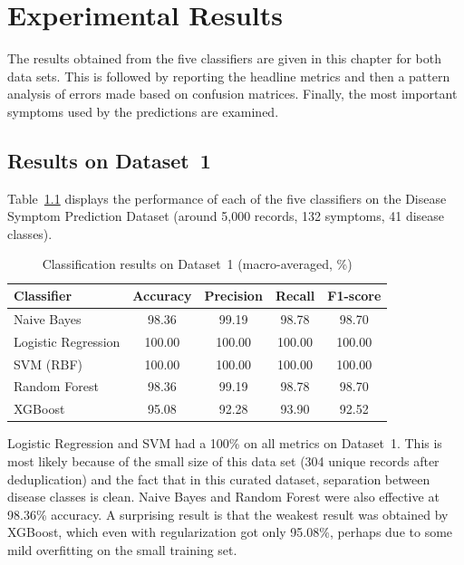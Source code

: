 \chapter{Experimental Results}
\label{ch:results}

The results obtained from the five classifiers are given in this chapter for both data sets. This is followed by reporting the headline metrics and then a pattern analysis of errors made based on confusion matrices. Finally, the most important symptoms used by the predictions are examined.

\section{Results on Dataset~1}
\label{sec:results_dataset1}

Table~\ref{tab:results_dataset1} displays the performance of each of the five classifiers on the Disease Symptom Prediction Dataset (around 5,000 records, 132 symptoms, 41 disease classes).

\begin{table}[H]
\centering
\caption{Classification results on Dataset~1 (macro-averaged, \%)}
\label{tab:results_dataset1}
\begin{tabular}{@{}lcccc@{}}
\toprule
\textbf{Classifier} & \textbf{Accuracy} & \textbf{Precision} & \textbf{Recall} & \textbf{F1-score} \\
\midrule
Naive Bayes          & 98.36 & 99.19 & 98.78 & 98.70 \\
Logistic Regression  & 100.00 & 100.00 & 100.00 & 100.00 \\
SVM (RBF)            & 100.00 & 100.00 & 100.00 & 100.00 \\
Random Forest        & 98.36 & 99.19 & 98.78 & 98.70 \\
XGBoost              & 95.08 & 92.28 & 93.90 & 92.52 \\
\bottomrule
\end{tabular}
\end{table}

Logistic Regression and SVM had a 100\% on all metrics on Dataset~1. This is most likely because of the small size of this data set (304 unique records after deduplication) and the fact that in this curated dataset, separation between disease classes is clean. Naive Bayes and Random Forest were also effective at 98.36\% accuracy. A surprising result is that the weakest result was obtained by XGBoost, which even with regularization got only 95.08\%, perhaps due to some mild overfitting on the small training set.

